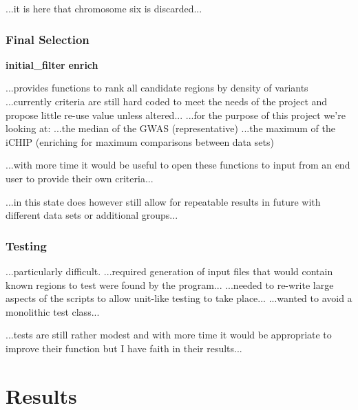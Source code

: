 ...it is here that chromosome six is discarded...

\subsection{Final Selection}

\textbf{initial\_filter}
\textbf{enrich}

...provides functions to rank all candidate regions by density of variants
...currently criteria are still hard coded to meet the needs of the project and
propose little re-use value unless altered...
...for the purpose of this project we're looking at:
...the median of the GWAS (representative)
...the maximum of the iCHIP (enriching for maximum comparisons between data sets)

...with more time it would be useful to open these functions to input from an
end user to provide their own criteria...

...in this state does however still allow for repeatable results in future with
different data sets or additional groups...

\subsection{Testing}
...particularly difficult.
...required generation of input files that would contain known regions to test
were found by the program...
...needed to re-write large aspects of the scripts to allow unit-like testing to
take place... ...wanted to avoid a monolithic test class...

...tests are still rather modest and with more time it would be appropriate to
improve their function but I have faith in their results...


\chapter{Results}

